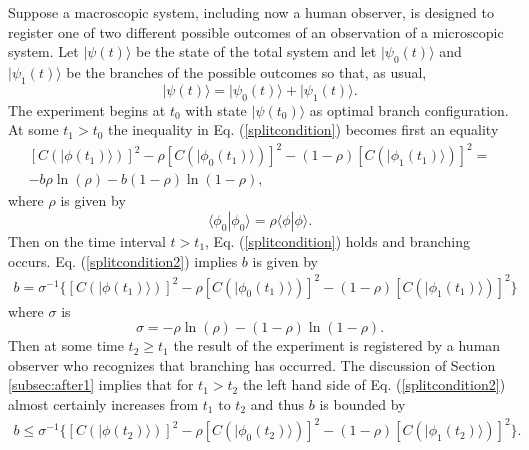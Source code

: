 \documentclass[12pt,amsmath,amssymb,onecolumn]{revtex4-2}
\begin{document}
Suppose a macroscopic system, including
now a human observer, is designed
to register one of two different possible outcomes
of an observation of a microscopic system.
Let $|\psi(t) \rangle $ be the state of the total system
and let $|\psi_0(t) \rangle $ and $|\psi_1(t) \rangle $ be the branches
of the possible outcomes so that, as usual,
\begin{equation}
  \label{humanobserver}
  |\psi(t) \rangle  = |\psi_0(t) \rangle  + |\psi_1(t) \rangle .
\end{equation}
The experiment begins at $t_0$ with
state $|\psi(t_0) \rangle $ as optimal branch
configuration.
At some $t_1 > t_0$ the inequality in Eq. (\ref{splitcondition}) becomes
first an equality
\begin{multline}\label{splitcondition2}
  [C( |\phi(t_1) \rangle )]^2 - 
  \rho [C( |\phi_0(t_1) \rangle )]^2 - ( 1 - \rho) [C( |\phi_1(t_1) \rangle )]^2 = \\
-b \rho \ln( \rho) - b ( 1 - \rho) \ln( 1 - \rho),
\end{multline}
where $\rho$ is given by
\begin{equation}
    \label{defofrho1}
     \langle  \phi_0 | \phi_0 \rangle  = \rho  \langle  \phi | \phi \rangle .
\end{equation}
Then on the time interval $t > t_1$,
Eq. (\ref{splitcondition}) holds 
and branching occurs. 
Eq. (\ref{splitcondition2}) implies $b$ is given by
\begin{multline}
  \label{splitcondition4}
  b = \sigma^{-1} \{  [C( |\phi(t_1) \rangle )]^2 -
  \rho [C( |\phi_0(t_1) \rangle )]^2 - ( 1 - \rho) [C( |\phi_1(t_1) \rangle )]^2 \}
\end{multline}
where $\sigma$ is
\begin{equation}
  \label{defsigma}
  \sigma =   -\rho \ln( \rho) - ( 1 - \rho) \ln( 1 - \rho).  
\end{equation}
Then at some time $t_2 \ge t_1$ the result of
the experiment is registered by a human observer
who recognizes that branching has occurred.
The discussion of Section \ref{subsec:after1} 
implies that for $t_1 > t_2$  the left hand side of Eq. (\ref{splitcondition2})
almost certainly increases from $t_1$ to $t_2$ and
thus $b$ is bounded by
\begin{multline}
  \label{splitcondition5}
  b \le \sigma^{-1}  \{ [C( |\phi(t_2) \rangle )]^2 - 
  \rho [C( |\phi_0(t_2) \rangle )]^2 - ( 1 - \rho) [C( |\phi_1(t_2) \rangle )]^2 \}.
\end{multline}
\end{document}
